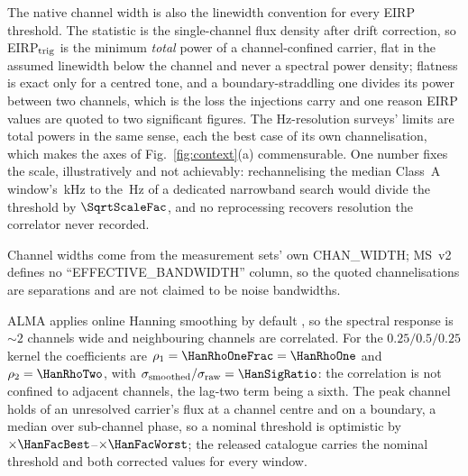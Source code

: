 The native channel width is also the linewidth convention for every EIRP
threshold. The statistic is the single-channel flux density after drift
correction, so EIRP$_{\rm trig}$ is the minimum \emph{total} power of a
channel-confined carrier, flat in the assumed linewidth below the channel and
never a spectral power density; flatness is exact only for a centred tone,
and a boundary-straddling one divides its power between two channels, which
is the loss the injections carry and one reason EIRP values are quoted to two
significant figures. The Hz-resolution
surveys' limits are total powers in the same sense, each the best case of
its own channelisation, which makes the axes of Fig.~\ref{fig:context}(a)
commensurable. One number fixes the scale, illustratively and not
achievably: rechannelising the median Class~A window's
\SqrtScaleChanKHz\,kHz to the \SETIChanHz\,Hz of a dedicated narrowband
search would divide the threshold by $\SqrtScaleFac$, and no reprocessing
recovers resolution the correlator never recorded.

Channel widths come from the measurement sets' own CHAN\_WIDTH; MS~v2
defines no ``EFFECTIVE\_BANDWIDTH'' column, so the quoted channelisations are
separations and are not claimed to be noise bandwidths.

ALMA applies online Hanning smoothing by default \citep{ALMAHandbook}, so
the spectral response is ${\sim}2$ channels wide and neighbouring channels
are correlated. For the $0.25/0.5/0.25$ kernel the coefficients
are $\rho_1=\HanRhoOneFrac=\HanRhoOne$ and $\rho_2=\HanRhoTwo$, with
$\sigma_{\rm smoothed}/\sigma_{\rm raw}=\HanSigRatio$: the correlation is
not confined to adjacent channels, the lag-two term being a sixth. The peak
channel holds \HanBest{} of an unresolved carrier's flux at a channel centre
and \HanWorst{} on a boundary, a median \HanMed{} over sub-channel phase, so
a nominal threshold is optimistic by
$\times\HanFacBest$--$\times\HanFacWorst$; the released catalogue carries the
nominal threshold and both corrected values for every window.

